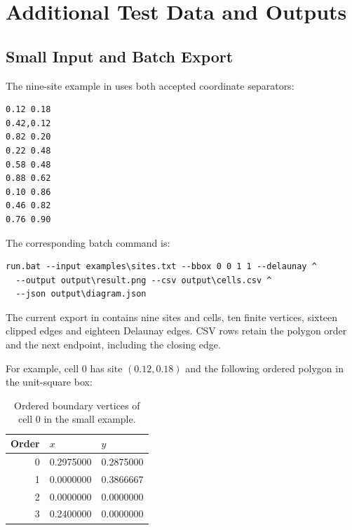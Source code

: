 \section{Additional Test Data and Outputs}
\label{sec:c}

\subsection{Small Input and Batch Export}

The nine-site example in  uses both accepted coordinate separators:

\begin{lstlisting}[language={},caption={Reproducible nine-site input.},label={lst:sample-sites}]
0.12 0.18
0.42,0.12
0.82 0.20
0.22 0.48
0.58 0.48
0.88 0.62
0.10 0.86
0.46 0.82
0.76 0.90
\end{lstlisting}

The corresponding batch command is:

\begin{lstlisting}[language={},caption={Export the small example inside a unit-square clipping box.},label={lst:sample-command}]
run.bat --input examples\sites.txt --bbox 0 0 1 1 --delaunay ^
  --output output\result.png --csv output\cells.csv ^
  --json output\diagram.json
\end{lstlisting}

The current export in  contains nine sites and cells, ten finite vertices, sixteen clipped edges and eighteen Delaunay edges. CSV rows retain the polygon order and the next endpoint, including the closing edge.

For example, cell 0 has site \((0.12,0.18)\) and the following ordered polygon in the unit-square box:

\begin{table}[!htbp]
\centering
\caption{Ordered boundary vertices of cell 0 in the small example.}
\label{tab:sample-cell}
\begin{tabularx}{0.72\linewidth}{@{}rXX@{}}
\toprule
\textbf{Order} & \textbf{$x$} & \textbf{$y$} \\
\midrule
0 & 0.2975000 & 0.2875000 \\
1 & 0.0000000 & 0.3866667 \\
2 & 0.0000000 & 0.0000000 \\
3 & 0.2400000 & 0.0000000 \\
\bottomrule
\end{tabularx}
\end{table}

